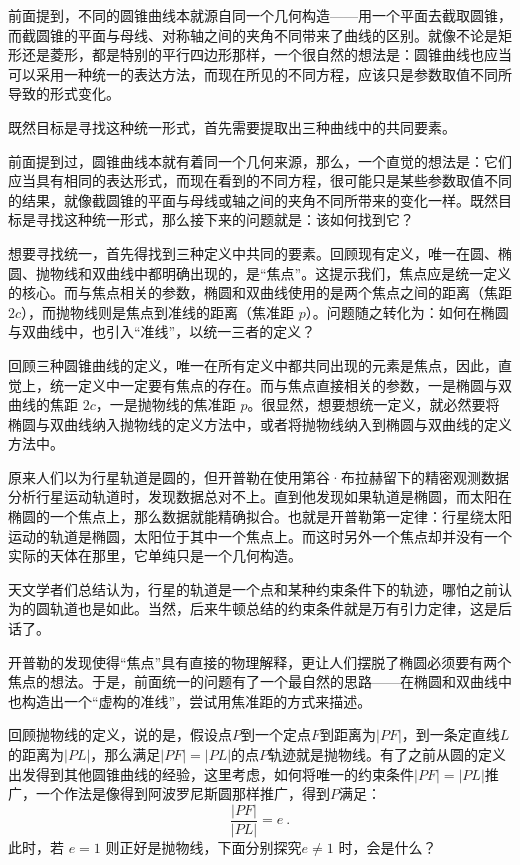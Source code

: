 前面提到，不同的圆锥曲线本就源自同一个几何构造——用一个平面去截取圆锥，而截圆锥的平面与母线、对称轴之间的夹角不同带来了曲线的区别。就像不论是矩形还是菱形，都是特别的平行四边形那样，一个很自然的想法是：圆锥曲线也应当可以采用一种统一的表达方法，而现在所见的不同方程，应该只是参数取值不同所导致的形式变化。

既然目标是寻找这种统一形式，首先需要提取出三种曲线中的共同要素。

前面提到过，圆锥曲线本就有着同一个几何来源，那么，一个直觉的想法是：它们应当具有相同的表达形式，而现在看到的不同方程，很可能只是某些参数取值不同的结果，就像截圆锥的平面与母线或轴之间的夹角不同所带来的变化一样。既然目标是寻找这种统一形式，那么接下来的问题就是：该如何找到它？

想要寻找统一，首先得找到三种定义中共同的要素。回顾现有定义，唯一在圆、椭圆、抛物线和双曲线中都明确出现的，是“焦点”。这提示我们，焦点应是统一定义的核心。而与焦点相关的参数，椭圆和双曲线使用的是两个焦点之间的距离（焦距 $2c$），而抛物线则是焦点到准线的距离（焦准距 $p$）。问题随之转化为：如何在椭圆与双曲线中，也引入“准线”，以统一三者的定义？


回顾三种圆锥曲线的定义，唯一在所有定义中都共同出现的元素是焦点，因此，直觉上，统一定义中一定要有焦点的存在。而与焦点直接相关的参数，一是椭圆与双曲线的焦距 $2c$，一是抛物线的焦准距 $p$。很显然，想要想统一定义，就必然要将椭圆与双曲线纳入抛物线的定义方法中，或者将抛物线纳入到椭圆与双曲线的定义方法中。

原来人们以为行星轨道是圆的，但开普勒在使用第谷·布拉赫留下的精密观测数据分析行星运动轨道时，发现数据总对不上。直到他发现如果轨道是椭圆，而太阳在椭圆的一个焦点上，那么数据就能精确拟合。也就是开普勒第一定律：行星绕太阳运动的轨道是椭圆，太阳位于其中一个焦点上。而这时另外一个焦点却并没有一个实际的天体在那里，它单纯只是一个几何构造。

天文学者们总结认为，行星的轨道是一个点和某种约束条件下的轨迹，哪怕之前认为的圆轨道也是如此。当然，后来牛顿总结的约束条件就是万有引力定律，这是后话了。

开普勒的发现使得“焦点”具有直接的物理解释，更让人们摆脱了椭圆必须要有两个焦点的想法。于是，前面统一的问题有了一个最自然的思路——在椭圆和双曲线中也构造出一个“虚构的准线”，尝试用焦准距的方式来描述。

回顾抛物线的定义，说的是，假设点$P$到一个定点$F$到距离为$|PF|$，到一条定直线$L$的距离为$|PL|$，那么满足$|PF|=|PL|$的点$P$轨迹就是抛物线。有了之前从圆的定义出发得到其他圆锥曲线的经验，这里考虑，如何将唯一的约束条件$|PF|=|PL|$推广，一个作法是像得到阿波罗尼斯圆那样推广，得到$P$满足：
\begin{equation}\label{eq_HsCsFD_1}
\frac{|PF|}{|PL|} = e~.
\end{equation}
此时，若 $e = 1$ 则正好是抛物线，下面分别探究$e \ne 1$ 时，会是什么？


